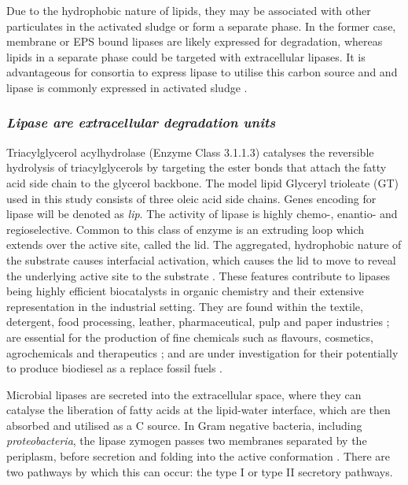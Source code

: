 \documentclass{article}
\begin{document}
Due to the hydrophobic nature of lipids, they may be associated with other particulates in the activated sludge or form a separate phase. In the former case, membrane or EPS bound lipases are likely expressed for degradation, whereas lipids in a separate phase could be targeted with extracellular lipases. It is advantageous for consortia to express lipase to utilise this carbon source and and lipase is commonly expressed in activated sludge \cite{gessesse2003lipase}. 


\subsubsection{\emph{Lipase are extracellular degradation units}}
Triacylglycerol acylhydrolase (Enzyme Class 3.1.1.3) catalyses the reversible hydrolysis of triacylglycerols by targeting the ester bonds that attach the fatty acid side chain to the glycerol backbone. The model lipid Glyceryl trioleate (GT) used in this study consists of three oleic acid side chains. Genes encoding for lipase will be denoted as \emph{lip}.
The activity of lipase is highly chemo-, enantio- and regioselective. Common to this class of enzyme is an extruding loop which extends over the active site, called the lid. The aggregated, hydrophobic nature of the substrate causes interfacial activation, which causes the lid to move to reveal the underlying active site to the substrate \cite{derewenda1992,van_Tilbeurgh1993}. These features contribute to lipases being highly efficient biocatalysts in organic chemistry and their extensive representation in the industrial setting. 
They are found within the textile, detergent, food processing, leather, pharmaceutical, pulp and paper industries \cite{hasan_06}; are essential for the production of fine chemicals such as flavours, cosmetics, agrochemicals and therapeutics \cite{jaeger2002}; and are under investigation for their potentially to produce biodiesel as a replace fossil fuels \cite{hasan_06,iso2001}. 


Microbial lipases are secreted into the extracellular space, where they can catalyse the liberation of fatty acids at the lipid-water interface, which are then absorbed and utilised as a C source. In Gram negative bacteria, including \emph{proteobacteria}, the lipase zymogen passes two membranes separated by the periplasm, before secretion and folding into the active conformation \cite{bos2007,michel2009}. There are two pathways by which this can occur: the type I or type II secretory pathways. 
\end{document}
